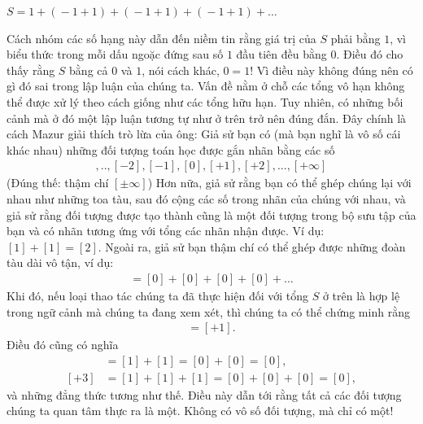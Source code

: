 \begin{multicols}{2}
	\vskip 0.15cm
	\centerline{$S \!=\! 1 \!+\! (\!-\! 1 \!+\! 1) \!+\! (\!-\! 1 \!+\! 1) \!+\! (\!-\! 1 \!+\! 1) \!+\! \ldots$}
	\vskip 0.05cm
	Cách nhóm các số hạng này dẫn đến niềm tin rằng giá trị của $S$ phải bằng $1$, vì biểu thức trong mỗi dấu ngoặc đứng sau số $1$ đầu tiên đều bằng $0$.
	\vskip 0.05cm
	Điều đó cho thấy rằng $S$ bằng cả $0$ và $1$, nói cách khác, $0 = 1$! Vì điều này không đúng nên có gì đó sai trong lập luận của chúng ta. Vấn đề nằm ở chỗ các tổng vô hạn không thể được xử lý theo cách giống như các tổng hữu hạn.
	\vskip 0.05cm
	Tuy nhiên, có những bối cảnh mà ở  đó một lập luận tương tự như ở trên trở nên đúng đắn. Đây chính là cách Mazur giải thích trò lừa của ông: 
	\vskip 0.05cm
	Giả sử bạn có (mà bạn nghĩ là vô số cái khác nhau) những đối tượng toán học được gắn nhãn bằng các số
	\begin{align*}
		[- \infty], .., [-2], [-1], [0], [+1], [+2], ..., [+\infty]
	\end{align*}
	(Đúng thế: thậm chí $[\pm {\infty}] $)
	\vskip 0.05cm
	Hơn nữa, giả sử rằng bạn có thể ghép chúng lại với nhau như những toa tàu, sau đó cộng các số trong nhãn của chúng với nhau, và giả sử rằng đối tượng được tạo thành cũng là một đối tượng trong bộ sưu tập của bạn và có nhãn tương ứng với tổng các nhãn nhận được. Ví dụ: $ [1] + [1] = [2]$. 
	\vskip 0.05cm
	Ngoài ra, giả sử bạn thậm chí có thể ghép  được những đoàn tàu dài vô tận, ví dụ:
	\begin{align*}
		[0] = [0] + [0] + [0] + [0] + \ldots
	\end{align*}
	Khi đó, nếu loại thao tác chúng ta đã thực hiện đối với tổng $S$ ở trên là hợp lệ trong ngữ cảnh mà chúng ta đang xem xét, thì chúng ta có thể chứng minh rằng
	\begin{align*}
		[0] = [+ 1].
	\end{align*}
	Điều đó cũng có nghĩa
	\begin{align*}
		 [+2] &= [1] + [1] = [0] + [0] = [0],\\
		[+3] &= [1] + [1] + [1] = [0] + [0] + [0] = [0],
	\end{align*}
	và những đẳng thức tương như thế.
	\vskip 0.05cm
	Điều này dẫn tới rằng tất cả các đối tượng chúng ta quan tâm thực ra là một. Không có vô số đối tượng, mà chỉ có một!
\end{multicols}